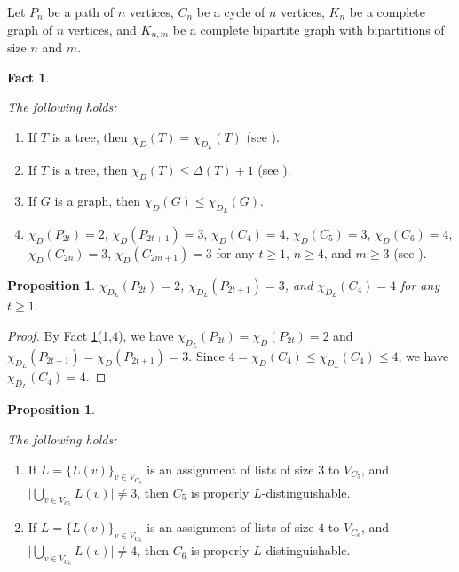 \documentclass[12pt,reqno,a4paper]{amsart}
\theoremstyle{definition}
\newtheorem{fact}[defn]{Fact}
\newtheorem{prop}[defn]{Proposition}
\begin{document}
Let $P_{n}$ be a path of $n$
vertices, $C_{n}$ be a cycle of $n$ vertices, $K_{n}$ be a complete graph of $n$ vertices, and $K_{n,m}$ be a complete bipartite graph with bipartitions of size $n$ and $m$.
\begin{fact}\label{Fact:2.1}
{\em The following holds:
\begin{enumerate}
    \item If $T$ is a tree, then $\chi_{D}(T) = \chi_{D_{L}}(T)$ (see \cite[Theorem 7]{FGHSW2013}).
    \item If $T$ is a tree, then $\chi_{D}(T) \leq \Delta(T) + 1$ (see \cite[Theorem 3.4]{CT2006}).
    
    \item If $G$ is a graph, then $\chi_{D}(G) \leq \chi_{D_{L}}(G)$.
    
    \item $\chi_D(P_{2t})=2 $, $\chi_D(P_{2t+1})=3 $, $\chi_D(C_{4})=4 $, $\chi_D(C_{5})=3 $, $\chi_D(C_{6})=4 $, $\chi_D(C_{2n})=3 $, $\chi_D(C_{2m+1})=3 $ for any $t\geq 1$, $n\geq 4 $, and $m\geq 3$ (see \cite[Theorem 2.2]{CT2006}). 
\end{enumerate}
}
\end{fact}

\begin{prop}\label{Proposition 2.2}
{\em $\chi_{D_{L}}(P_{2t})=2$, $\chi_{D_{L}}(P_{2t+1})=3$, and $\chi_{D_{L}}(C_{4})=4$ for any $t\geq 1$.
}
\end{prop}

\begin{proof}
By Fact \ref{Fact:2.1}(1,4), we have $\chi_{D_{L}}(P_{2t})=\chi_{D}(P_{2t})=2$ and $\chi_{D_{L}}(P_{2t+1})=\chi_{D}(P_{2t+1})=3$.
Since $4 = \chi_D(C_4)\leq \chi_{D_L}(C_4)\leq 4$, we have $\chi_{D_L}(C_4)= 4$.
\end{proof}

\begin{prop}\label{Proposition 2.3}
{\em The following holds:
\begin{enumerate}
    \item If $L=\{L(v)\}_{v\in V_{C_{5}}}$ is an assignment of lists of size $3$ to  $V_{C_{5}}$, and $\vert \bigcup_{v\in V_{C_{5}}} L(v)\vert \neq 3$, then $C_{5}$ is properly $L$-distinguishable.
    
    \item If $L=\{L(v)\}_{v\in V_{C_{6}}}$ is an assignment of lists of size $4$ to  $V_{C_{6}}$, and $\vert \bigcup_{v\in V_{C_{6}}} L(v)\vert \neq 4$, then $C_{6}$ is properly $L$-distinguishable.
\end{enumerate}
}
\end{prop}
\end{document}
